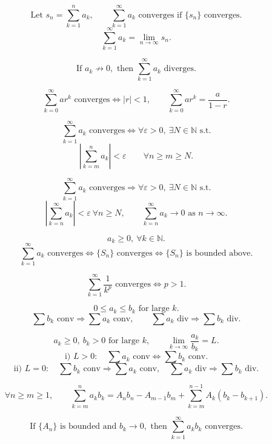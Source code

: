 \documentclass[11pt]{article}
\begin{document}


\[
\text{Let }s_n=\sum_{k=1}^{n}a_k,\qquad
\sum_{k=1}^{\infty}a_k\text{ converges if }\{s_n\}\text{ converges.}
\]
\[
\sum_{k=1}^{\infty}a_k=\lim_{n\to\infty}s_n.
\]

\[
\text{If }a_k\not\to0,\text{ then }\sum_{k=1}^{\infty}a_k\text{ diverges.}
\]

\[
\sum_{k=0}^{\infty}ar^k\text{ converges}\Longleftrightarrow |r|<1,
\qquad
\sum_{k=0}^{\infty}ar^k=\frac{a}{1-r}.
\]

\[
\sum_{k=1}^{\infty}a_k\text{ converges}
\Longleftrightarrow
\forall\varepsilon>0,\ \exists N\in\mathbb N\text{ s.t.}
\]
\[
\left|\sum_{k=m}^{n}a_k\right|<\varepsilon
\qquad \forall n\ge m\ge N.
\]

\[
\sum_{k=1}^{\infty}a_k\text{ converges}
\Longrightarrow
\forall\varepsilon>0,\ \exists N\in\mathbb N\text{ s.t.}
\]
\[
\left|\sum_{k=n}^{\infty}a_k\right|<\varepsilon\ \forall n\ge N,
\qquad
\sum_{k=n}^{\infty}a_k\to0\text{ as }n\to\infty.
\]

\[
a_k\ge0,\ \forall k\in\mathbb N.
\]
\[
\sum_{k=1}^{\infty}a_k\text{ converges}
\Longleftrightarrow
\{S_n\}\text{ converges}
\Longleftrightarrow
\{S_n\}\text{ is bounded above.}
\]

\[
\sum_{k=1}^{\infty}\frac1{k^p}\text{ converges}
\Longleftrightarrow p>1.
\]

\[
0\le a_k\le b_k\text{ for large }k.
\]
\[
\sum b_k\text{ conv}\Longrightarrow\sum a_k\text{ conv},
\qquad
\sum a_k\text{ div}\Longrightarrow\sum b_k\text{ div}.
\]

\[
a_k\ge0,\ b_k>0\text{ for large }k,\qquad
\lim_{k\to\infty}\frac{a_k}{b_k}=L.
\]
\[
\text{i) }L>0:\quad \sum a_k\text{ conv}\Longleftrightarrow\sum b_k\text{ conv}.
\]
\[
\text{ii) }L=0:\quad
\sum b_k\text{ conv}\Longrightarrow\sum a_k\text{ conv},
\quad
\sum a_k\text{ div}\Longrightarrow\sum b_k\text{ div}.
\]

\[
\forall n\ge m\ge1,\qquad
\sum_{k=m}^{n}a_kb_k
=A_nb_n-A_{m-1}b_m+\sum_{k=m}^{n-1}A_k(b_k-b_{k+1}).
\]

\[
\text{If }\{A_n\}\text{ is bounded and }b_k\to0,\text{ then }
\sum_{k=1}^{\infty}a_kb_k\text{ converges.}
\]
\end{document}
